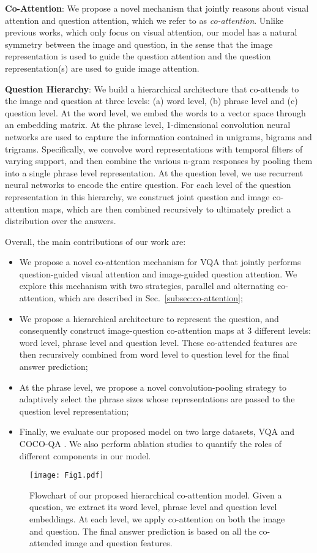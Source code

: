 \documentclass{article}
\begin{document}
\textbf{Co-Attention}: We propose a novel mechanism that jointly reasons about visual attention and question attention, which we refer to as \emph{co-attention}. Unlike previous works, which only focus on visual attention, our model has a natural symmetry between the image and question, in the sense that the image representation is used to guide the question attention and the question representation(s) are used to guide image attention. 



\textbf{Question Hierarchy}: We build a hierarchical architecture that co-attends to the image and question at three levels: (a) word level, (b) phrase level and (c) question level. At the word level, we embed the words to a vector space through an embedding matrix. At the phrase level, 1-dimensional convolution neural networks are used to capture the information contained in unigrams, bigrams and trigrams. Specifically, we convolve word representations with temporal filters of varying support, and then combine the various n-gram responses by pooling them into a single phrase level representation. At the question level, we use recurrent neural networks to encode the entire question. For each level of the question representation in this hierarchy, we construct joint question and image co-attention maps, which are then combined recursively to ultimately predict a distribution over the answers. 

Overall, the main contributions of our work are:
\begin{itemize}
\item We propose a novel co-attention mechanism for VQA that jointly performs question-guided visual attention and image-guided question attention. We explore this mechanism with two strategies, parallel and alternating co-attention, which are described in Sec.~\ref{subsec:co-attention};
\item We propose a hierarchical architecture to represent the question, and consequently construct image-question co-attention maps at 3 different levels: word level, phrase level and question level. These co-attended features are then recursively combined from word level to question level for the final answer prediction;
\item At the phrase level, we propose a novel convolution-pooling strategy to adaptively select the phrase sizes whose representations are passed to the question level representation;
\item Finally, we evaluate our proposed model on two large datasets, VQA \cite{antol2015vqa} and COCO-QA \cite{ren2015exploring}. We also perform ablation studies to quantify the roles of different components in our model.
\end{itemize}
\begin{figure}[t]
 \centering
 \texttt{[image: Fig1.pdf]}
 \caption{Flowchart of our proposed hierarchical co-attention model. Given a question, we extract its word level, phrase level and question level embeddings. At each level, we apply co-attention on both the image and question. The final answer prediction is based on all the co-attended image and question features.}
 \label{fig:teaser}
\end{figure}
\end{document}
